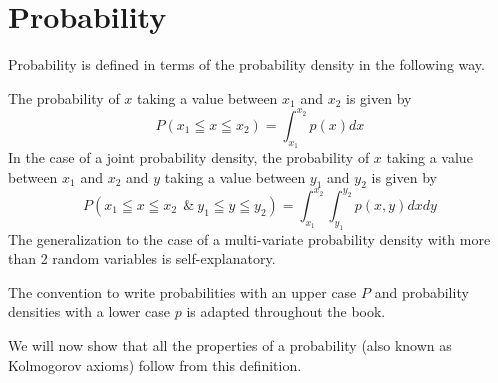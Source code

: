 \documentclass{tstextbook}
\begin{document}
\section{Probability}

Probability is defined in terms of the probability density in the following way.

\begin{definition}[Probability]
  \label{th:probability}
  The probability of $x$ taking a value between $x_1$ and $x_2$ is given by
  \begin{equation}
    P(x_1\leqq x\leqq x_2)=\int_{x_1}^{x_2}p(x)dx
  \end{equation}
  In the case of a joint probability density, the probability of $x$ taking a value between $x_1$ and $x_2$ and $y$ taking a value between $y_1$ and $y_2$ is given by
  \begin{equation}
    P(x_1\leqq x\leqq x_2\:\ \& \:y_1\leqq y\leqq y_2)=\int_{x_1}^{x_2}\int_{y_1}^{y_2}p(x,y)dxdy
  \end{equation}
  The generalization to the case of a multi-variate probability density with more than 2 random variables is self-explanatory. 
\end{definition}
The convention to write probabilities with an upper case $P$ and probability densities with a lower case $p$ is adapted throughout the book.

We will now show that all the properties of a probability (also known as Kolmogorov axioms) follow from this definition.
\end{document}
